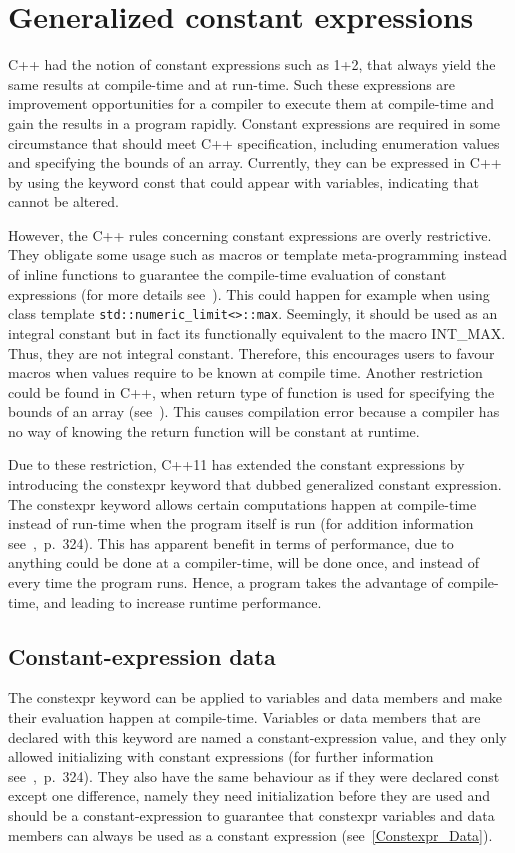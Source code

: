 \documentclass[11pt]{report}
\begin{document}
\section{Generalized constant expressions}
\label{section: Generalized constant expressions}
C++ had the notion of constant expressions such as 1+2, that always yield the same results at compile-time and at run-time. Such these expressions are improvement opportunities for a compiler to execute them at compile-time and gain the results in a program rapidly. Constant expressions are required in some circumstance that should meet C++ specification, including enumeration values and specifying the bounds of an array. Currently, they can be expressed in C++ by using the keyword const that could appear with variables, indicating that cannot be altered.

However, the C++ rules concerning constant expressions are overly restrictive. They obligate some usage such as macros or template meta-programming instead of inline functions to guarantee the compile-time evaluation of constant expressions (for more details see~\cite{Stroustrup:2012:Cpp11}). This could happen for example when using class template \texttt{std::numeric\_limit<>::max}. Seemingly, it should be used as an integral constant but in fact its functionally equivalent to the macro INT\_MAX. Thus, they are not integral constant. Therefore, this encourages users to favour macros when values require to be known at compile time. Another restriction could be found in C++, when return type of function is used for specifying the bounds of an array (see~\cite{Stroustrup:2012:Cpp11}). This causes compilation error because a compiler has no way of knowing the return function will be constant at runtime.

Due to these restriction, C++11 has extended the constant expressions by introducing the constexpr keyword that dubbed generalized constant expression. The constexpr keyword allows certain computations happen at compile-time instead of run-time when the program itself is run (for addition information see~\cite{Williams:2012:CCA},~p.~324). This has apparent benefit in terms of performance, due to anything could be done at a compiler-time, will be done once, and instead of every time the program runs. Hence, a program takes the advantage of compile-time, and leading to increase runtime performance.

\subsection{Constant-expression data}
\label{subsection: constant-expression data}
The constexpr keyword can be applied to variables and data members and make their evaluation happen at compile-time. Variables or data members that are declared with this keyword are named a constant-expression value, and they only allowed initializing with constant expressions (for further information see~\cite{Williams:2012:CCA},~p.~324). They also have the same behaviour as if they were declared const except one difference, namely they need initialization before they are used and should be a constant-expression to guarantee that constexpr variables and data members can always be used as a constant expression (see~\ref{Constexpr_Data}). 
\end{document}
